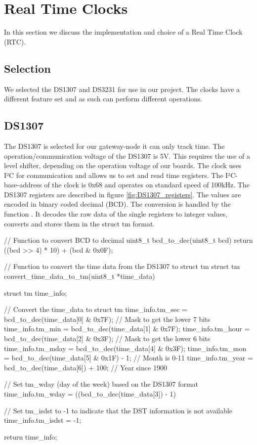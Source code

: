 \section{Real Time Clocks}
In this section we discuss the implementation and choice of a Real Time Clock (RTC).
\subsection{Selection}
We selected the DS1307 and DS3231 for use in our project. The clocks have a different feature set and as such can perform different operations.

\subsection{DS1307}
The DS1307 is selected for our gateway-node it can only track time.
The operation/communication voltage of the DS1307 is 5V. This requires the use of a level shifter, depending on the operation voltage of our boards. 
The clock uses I²C for communication and allows us to set and read time registers.
The I²C-base-address of the clock is 0x68 and operates on standard speed of 100kHz. 
The DS1307 registers are described in figure \ref{fig:DS1307_registers}. The values are encoded in binary coded decimal (BCD).
The conversion is handled by the function . It decodes the raw data of the single registers to integer values, converts and stores them in the struct tm format. 

\begin{cpp}[caption={Converting DS1307 register values to struct tm data}]
// Function to convert BCD to decimal
uint8_t bcd_to_dec(uint8_t bcd)
{
    return ((bcd >> 4) * 10) + (bcd & 0x0F);
}

// Function to convert the time data from the DS1307 to struct tm
struct tm convert_time_data_to_tm(uint8_t *time_data)
{
    struct tm time_info;

    // Convert the time_data to struct tm
    time_info.tm_sec = bcd_to_dec(time_data[0] & 0x7F); // Mask to get the lower 7 bits
    time_info.tm_min = bcd_to_dec(time_data[1] & 0x7F);
    time_info.tm_hour = bcd_to_dec(time_data[2] & 0x3F); // Mask to get the lower 6 bits
    time_info.tm_mday = bcd_to_dec(time_data[4] & 0x3F);
    time_info.tm_mon = bcd_to_dec(time_data[5] & 0x1F) - 1; // Month is 0-11
    time_info.tm_year = bcd_to_dec(time_data[6]) + 100;     // Year since 1900

    // Set tm_wday (day of the week) based on the DS1307 format
    time_info.tm_wday = ((bcd_to_dec(time_data[3]) - 1) %

    // Set tm_isdst to -1 to indicate that the DST information is not available
    time_info.tm_isdst = -1;

    return time_info;
}
\end{cpp}

